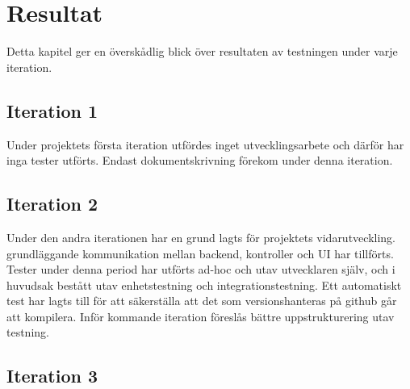 \documentclass[10pt]{article}
\begin{document}
\section{Resultat}
Detta kapitel ger en överskådlig blick över resultaten av testningen under varje iteration.

\subsection{Iteration 1}
Under projektets första iteration utfördes inget utvecklingsarbete och därför har inga tester utförts. Endast dokumentskrivning förekom under denna iteration.
\subsection{Iteration 2}
Under den andra iterationen har en grund lagts för projektets vidarutveckling. grundläggande kommunikation mellan backend, kontroller och UI har tillförts. Tester under denna period har utförts ad-hoc och utav utvecklaren själv, och i huvudsak bestått utav enhetstestning och integrationstestning. Ett automatiskt test har lagts till för att säkerställa att det som versionshanteras på github går att kompilera. Inför kommande iteration föreslås bättre uppstrukturering utav testning.
\subsection{Iteration 3}
\end{document}
